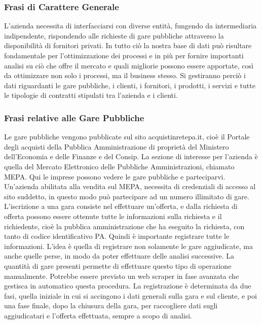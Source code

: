 
\subsubsection{Frasi di Carattere Generale}
L'azienda necessita di interfacciarsi con diverse entità, fungendo da intermediaria indipendente, rispondendo alle richieste di gare pubbliche attraverso la disponibilità di fornitori privati. In tutto ciò la nostra base di dati può risultare fondamentale per l'ottimizzazione dei processi e in più per fornire importanti analisi su ciò che offre il mercato e quali migliorie possono essere apportate, così da ottimizzare non solo i processi, ma il business stesso.\newline
Si gestiranno perciò i dati riguardanti le gare pubbliche, i clienti, i fornitori, i prodotti, i servizi e tutte le tipologie di contratti stipulati tra l'azienda e i clienti.

\subsubsection{Frasi relative alle Gare Pubbliche}
Le gare pubbliche vengono pubblicate sul sito acquistinretepa.it, cioè il Portale degli acquisti della Pubblica Amministrazione di proprietà del Ministero dell'Economia e delle Finanze e del Consip.\newline
La sezione di interesse per l'azienda è quella del Mercato Elettronico delle Pubbliche Amministrazioni, chiamato MEPA. Qui le imprese possono vedere le gare pubbliche e parteciparvi.\newline
Un'azienda abilitata alla vendita sul MEPA, necessita di credenziali di accesso al sito suddetto, in questo modo può partecipare ad un numero illimitato di gare.\newline
L'iscrizione a una gara consiste nel effettuare un'offerta, e dalla richiesta di offerta possono essere ottenute tutte le informazioni sulla richiesta e il richiedente, cioè la pubblica amministrazione che ha eseguito la richiesta, con tanto di codice identificativo PA.\newline
Quindi è importante registrare tutte le informazioni. L'idea è quella di registrare non solamente le gare aggiudicate, ma anche quelle perse, in modo da poter effettuare delle analisi successive. La quantità di gare presenti permette di effettuare questo tipo di operazione manualmente. Potrebbe essere previsto un web scraper in fase avanzata che gestisca in automatico questa procedura.\newline
La registrazione è determinata da due fasi, quella iniziale in cui si accingono i dati generali sulla gara e sul cliente, e poi una fase finale, dopo la chiusura della gara, per raccogliere dati sugli aggiudicatari e l'offerta effettuata, sempre a scopo di analisi.

